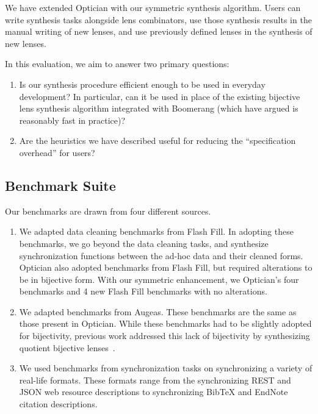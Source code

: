 \documentclass[acmsmall,screen,anonymous]{acmart}
\begin{document}
We have extended Optician with our symmetric synthesis algorithm. Users can 
write synthesis tasks alongside lens combinators, use those synthesis results in
the manual writing of new lenses, and use previously defined lenses in the
synthesis of new lenses.

In this evaluation, we aim to answer two primary questions:
\begin{enumerate}
\item Is our synthesis procedure efficient enough to be used in everyday
  development?  In particular, can it be used in place of the existing
  bijective lens synthesis algorithm integrated with Boomerang (which
  \citet{miltner+:bijective-synthesis} have argued is reasonably fast in
  practice)? 
  \item Are the heuristics we have described useful for reducing the 
  ``specification overhead'' for users?  
\end{enumerate}

\subsection{Benchmark Suite}
Our benchmarks are drawn from four different sources.
\begin{enumerate}
\item We adapted  data cleaning benchmarks from Flash Fill. In adopting
  these benchmarks, we go beyond the data cleaning tasks, and
  synthesize 
  synchronization functions
  between the ad-hoc data and their cleaned forms. 
  Optician also adopted benchmarks from Flash Fill, but required alterations to
  be in bijective form. With our symmetric enhancement, we
   Optician's four 
  benchmarks and 4 new Flash Fill benchmarks with no alterations.
\item We adapted  benchmarks from Augeas.  These benchmarks are the same
  as those present in Optician.  While these benchmarks had to be slightly
  adopted for bijectivity, previous work addressed this lack of bijectivity by
  synthesizing quotient bijective lenses~\cite{?}.
\item We used  benchmarks from synchronization tasks on synchronizing a
  variety of real-life formats. These formats range from the synchronizing REST
  and JSON web resource descriptions to synchronizing BibTeX and EndNote
  citation descriptions.
\end{enumerate}
\end{document}

